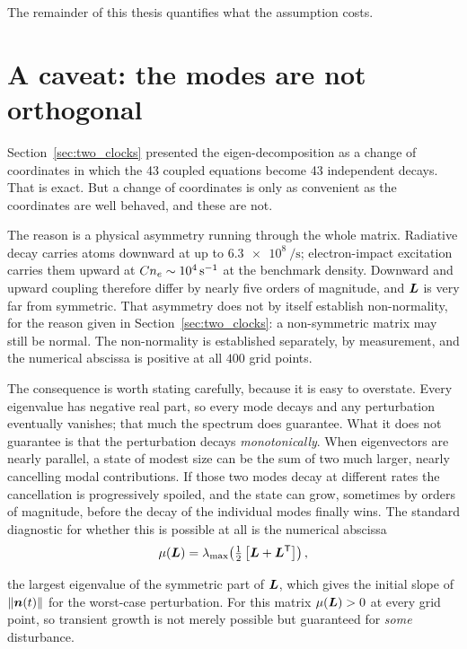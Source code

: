 The remainder of this thesis quantifies what the assumption costs.

\section{A caveat: the modes are not orthogonal}
\label{sec:transient_growth}

Section~\ref{sec:two_clocks} presented the eigen-decomposition as a change of
coordinates in which the 43 coupled equations become 43 independent decays. That
is exact. But a change of coordinates is only as convenient as the coordinates
are well behaved, and these are not.

The reason is a physical asymmetry running through the whole matrix. Radiative
decay carries atoms downward at up to $\SI{6.3e8}{\per\second}$; electron-impact
excitation carries them upward at $Cn_e \sim \SI{e4}{\per\second}$ at the
benchmark density. Downward and upward coupling therefore differ by nearly five
orders of magnitude, and $\bm{L}$ is very far from symmetric. That asymmetry does
not by itself establish non-normality, for the reason given in
Section~\ref{sec:two_clocks}: a non-symmetric matrix may still be normal. The
non-normality is established separately, by measurement, and the numerical
abscissa is positive at all $400$ grid points.

The consequence is worth stating carefully, because it is easy to overstate.
Every eigenvalue has negative real part, so every mode decays and any
perturbation eventually vanishes; that much the spectrum does guarantee.
What it does not guarantee is that the perturbation decays \emph{monotonically}.
When eigenvectors are nearly parallel, a state of modest size can be the sum of
two much larger, nearly cancelling modal contributions. If those two modes decay
at different rates the cancellation is progressively spoiled, and the state can
grow, sometimes by orders of magnitude, before the decay of the individual
modes finally wins. The standard diagnostic for whether this is possible at all
is the numerical abscissa
\begin{equation}
  \mu(\bm{L}) = \lambda_{\max}\!\left(\tfrac{1}{2}\left[\bm{L} + \bm{L}^{\mathsf T}\right]\right),
  \label{eq:numerical_abscissa}
\end{equation}

\noindent the largest eigenvalue of the symmetric part of $\bm{L}$, which gives
the initial slope of $\|\bm{n}(t)\|$ for the worst-case perturbation. For this
matrix $\mu(\bm{L}) > 0$ at every grid point, so transient growth is not merely
possible but guaranteed for \emph{some} disturbance.

